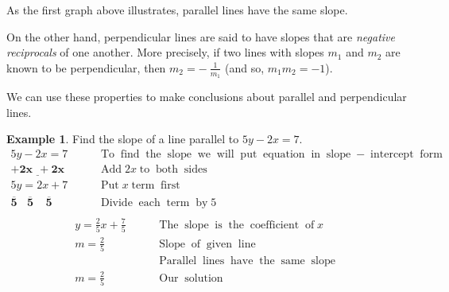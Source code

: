 \documentclass[12pt]{book}
\theoremstyle{definition}
\newtheorem{example}{Example}
\newcommand{\tmmathbf}[1]{\ensuremath{\boldsymbol{#1}}}
\newcommand{\tmop}[1]{\ensuremath{\operatorname{#1}}}
\begin{document}
As the first graph above illustrates, parallel lines have the same slope.\par

On the other hand, perpendicular lines are said to have slopes that are {\it negative reciprocals} of one another.   More precisely, if two lines with slopes $m_1$ and $m_2$ are known to be perpendicular, then $m_2=-~\displaystyle\frac{1}{m_1}$ (and so, $m_1m_2=-1$).\par
We can use these properties to make conclusions about parallel and perpendicular lines.
\begin{example}\label{Lin69} Find the slope of a line parallel to $5 y - 2 x = 7$.
  \begin{eqnarray*}
    5 y - 2 x = 7~~~~~ &  & \tmop{To} \tmop{find} \tmop{the} \tmop{slope} \tmop{we}
    \tmop{will} \tmop{put} \tmop{equation} \tmop{in} \tmop{slope} -
    \tmop{intercept} \tmop{form}\\
    \tmmathbf{\underline{+ 2 x ~~ + 2 x}} &  & \tmop{Add} 2 x \tmop{to} \tmop{both}
    \tmop{sides}\\
    5 y = 2 x + 7~~~~~ &  & \tmop{Put} x \tmop{term} \tmop{first}\\
    \tmmathbf{\overline{5} ~~~~ \overline{5} ~~~~~ \overline{5}}~~~~~ &  & \tmop{Divide} \tmop{each}
    \tmop{term} \tmop{by} 5\\
  \end{eqnarray*}
  \begin{eqnarray*}
    y = \frac{2}{5} x + \frac{7}{5}~~~~~ &  & \tmop{The} \tmop{slope} \tmop{is}
    \tmop{the} \tmop{coefficient} \tmop{of} x\\
    m = \frac{2}{5}~~~~~ &  & \tmop{Slope} \tmop{of} \tmop{given} \tmop{line}\\
		& & \tmop{Parallel} \tmop{lines} \tmop{have} \tmop{the} \tmop{same}
    \tmop{slope}\\
    m = \frac{2}{5}~~~~~ &  & \tmop{Our} \tmop{solution}
  \end{eqnarray*}
\end{example}
\end{document}
